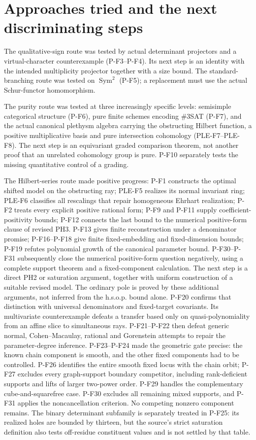 \documentclass[11pt,a4paper]{article}
\begin{document}
\section{Approaches tried and the next discriminating steps}
The qualitative-sign route was tested by actual determinant projectors
and a virtual-character counterexample (P-F3--P-F4). Its next step is an
identity with the intended multiplicity projector together with a size
bound. The standard-branching route was tested on $\operatorname{Sym}^2$
(P-F5); a replacement must use the actual Schur-functor homomorphism.

The purity route was tested at three increasingly specific levels:
semisimple categorical structure (P-F6), pure finite schemes encoding
\#3SAT (P-F7), and the actual canonical plethysm algebra carrying the
obstructing Hilbert function, a positive multiplicative basis and pure
intersection cohomology (PLE-F7--PLE-F8). The next step is an
equivariant graded comparison theorem, not another proof that an unrelated
cohomology group is pure. P-F10 separately tests the missing quantitative
control of a grading.

The Hilbert-series route made positive progress: P-F1 constructs the
optimal shifted model on the obstructing ray; PLE-F5 realizes its normal
invariant ring; PLE-F6 classifies all rescalings that repair homogeneous
Ehrhart realization; P-F2 treats every explicit positive rational form;
P-F9 and P-F11 supply coefficient-positivity bounds; P-F12 connects the
last bound to the numerical positive-form clause of revised PH3.
P-F13 gives finite reconstruction under a denominator promise;
P-F16--P-F18 give finite fixed-embedding and fixed-dimension bounds;
P-F19 refutes polynomial growth of the canonical parameter bound.
P-F30--P-F31 subsequently close the numerical positive-form question
negatively, using a complete support theorem and a fixed-component
calculation. The next step is a direct PH2 or saturation argument,
together with uniform construction of a suitable revised model.
The ordinary pole is proved by these additional arguments, not
inferred from the h.s.o.p. bound alone.
P-F20 confirms that distinction with universal denominators and
fixed-target covariants. Its multivariate counterexample defeats a
transfer based only on quasi-polynomiality from an affine slice to
simultaneous rays. P-F21--P-F22 then defeat generic normal,
Cohen--Macaulay, rational and Gorenstein attempts to repair the
parameter-degree inference. P-F23--P-F24 made the geometric gate precise: the known chain
component is smooth, and the other fixed components had to be
controlled. P-F26 identifies the entire smooth fixed locus with
the chain orbit; P-F27 excludes every graph-support boundary
competitor, including rank-deficient supports and lifts of larger
two-power order. P-F29 handles the complementary cube-and-squarefree
case. P-F30 excludes all remaining mixed supports, and P-F31 applies
the noncancellation criterion. No competing nonzero component remains. The binary determinant subfamily is separately treated
in P-F25: its realized holes are bounded by thirteen, but the
source's strict saturation definition also tests off-residue
constituent values and is not settled by that table.
\end{document}
